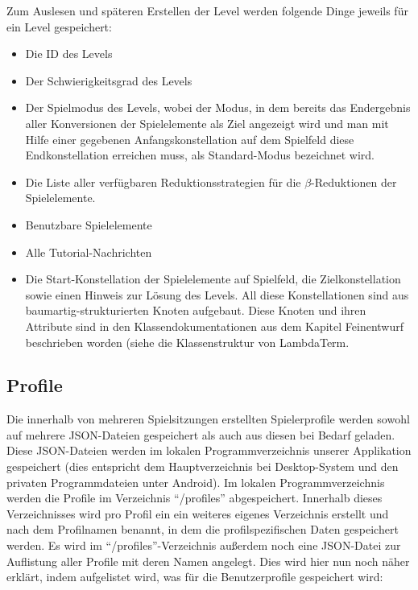 Zum Auslesen und späteren Erstellen der Level werden folgende Dinge jeweils für ein Level gespeichert: 
\begin{itemize}
	\item Die ID des Levels
	\item Der Schwierigkeitsgrad des Levels
	\item Der Spielmodus des Levels, wobei der Modus, in dem bereits das Endergebnis aller Konversionen der Spielelemente als Ziel angezeigt wird und man mit Hilfe einer gegebenen Anfangskonstellation auf dem Spielfeld diese Endkonstellation erreichen muss, als Standard-Modus bezeichnet wird.
	\item Die Liste aller verfügbaren Reduktionsstrategien für die $\beta$-Reduktionen der Spielelemente.
	\item Benutzbare Spielelemente
	\item Alle Tutorial-Nachrichten
	\item Die Start-Konstellation der Spielelemente auf Spielfeld, die Zielkonstellation sowie einen Hinweis zur Lösung des Levels. All diese Konstellationen sind aus baumartig-strukturierten Knoten aufgebaut. Diese Knoten und ihren Attribute sind in den Klassendokumentationen aus dem Kapitel Feinentwurf beschrieben worden (siehe die Klassenstruktur von LambdaTerm.	
\end{itemize}



\subsection{Profile}

Die innerhalb von mehreren Spielsitzungen erstellten Spielerprofile werden sowohl auf mehrere JSON-Dateien gespeichert als auch aus diesen bei Bedarf geladen. Diese JSON-Dateien werden im lokalen Programmverzeichnis unserer Applikation gespeichert (dies entspricht dem Hauptverzeichnis bei Desktop-System und den privaten Programmdateien unter Android). Im lokalen Programmverzeichnis werden die Profile im Verzeichnis "`/profiles"' abgespeichert. Innerhalb dieses Verzeichnisses wird pro Profil ein ein weiteres eigenes Verzeichnis erstellt und nach dem Profilnamen benannt, in dem die profilspezifischen Daten gespeichert werden. Es wird im "`/profiles"'-Verzeichnis außerdem noch eine JSON-Datei zur Auflistung aller Profile mit deren Namen angelegt. Dies wird hier nun noch näher erklärt, indem aufgelistet wird, was für die Benutzerprofile gespeichert wird:

